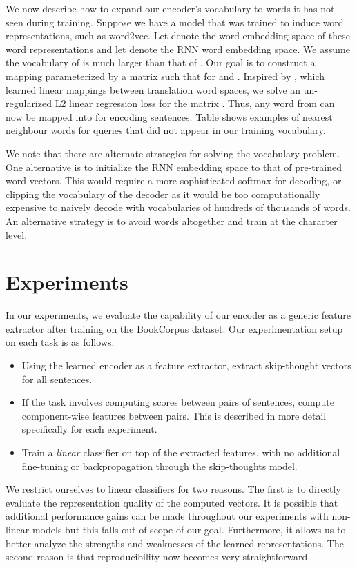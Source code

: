\documentclass{article} \usepackage{nips15submit_e,times}
\begin{document}
We now describe how to expand our encoder's vocabulary to words it has not seen during training. Suppose we have a model that was trained to induce word representations, such as word2vec. Let  denote the word embedding space of these word representations and let  denote the RNN word embedding space. We assume the vocabulary of  is much larger than that of . Our goal is to construct a mapping  parameterized by a matrix  such that  for  and . Inspired by \cite{mikolov2013exploiting}, which learned linear mappings between translation word spaces, we solve an un-regularized L2 linear regression loss for the matrix . Thus, any word from  can now be mapped into  for encoding sentences. Table  shows examples of nearest neighbour words for queries that did not appear in our training vocabulary.

We note that there are alternate strategies for solving the vocabulary problem. One alternative is to initialize the RNN embedding space to that of pre-trained word vectors. This would require a more sophisticated softmax for decoding, or clipping the vocabulary of the decoder as it would be too computationally expensive to naively decode with vocabularies of hundreds of thousands of words. An alternative strategy is to avoid words altogether and train at the character level. 

\section{Experiments}

In our experiments, we evaluate the capability of our encoder as a generic feature extractor after training on the BookCorpus dataset. Our experimentation setup on each task is as follows:
\begin{itemize}[leftmargin=*]
\item Using the learned encoder as a feature extractor, extract skip-thought vectors for all sentences.
\item If the task involves computing scores between pairs of sentences, compute component-wise features between pairs. This is described in more detail specifically for each experiment.
\item Train a {\it linear} classifier on top of the extracted features, with no additional fine-tuning or backpropagation through the skip-thoughts model.
\end{itemize}
We restrict ourselves to linear classifiers for two reasons. The first is to directly evaluate the representation quality of the computed vectors. It is possible that additional performance gains can be made throughout our experiments with non-linear models but this falls out of scope of our goal. Furthermore, it allows us to better analyze the strengths and weaknesses of the learned representations. The second reason is that reproducibility now becomes very straightforward.
\end{document}
